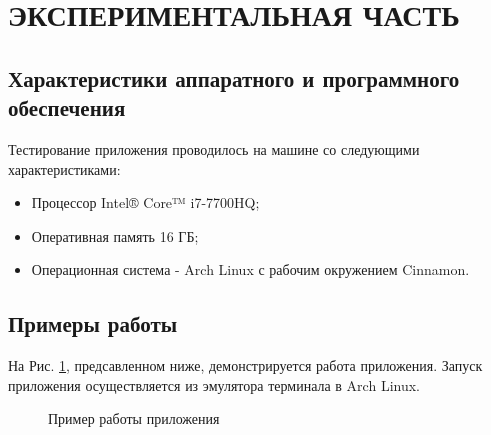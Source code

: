\documentclass[a4paper,12pt]{article}
\begin{document}
\newpage
\section{ЭКСПЕРИМЕНТАЛЬНАЯ ЧАСТЬ}
\subsection{Характеристики аппаратного и программного обеспечения}
Тестирование приложения проводилось на машине со следующими характеристиками:\\
\begin{itemize}
\item Процессор Intel® Core™ i7-7700HQ;
\item Оперативная память 16 ГБ;
\item Операционная система - Arch Linux с рабочим окружением Cinnamon.
\end{itemize}

\newpage
\subsection{Примеры работы}
На Рис. \ref{images:example}, предсавленном ниже, демонстрируется работа приложения. Запуск приложения осуществляется из эмулятора терминала в Arch Linux.
\begin{figure}[h]
\caption{Пример работы приложения}
\label{images:example}
\end{figure}

\newpage
\end{document}
